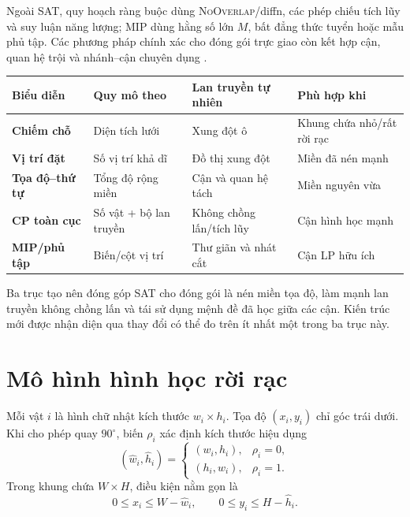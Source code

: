 Ngoài SAT, quy hoạch ràng buộc dùng \textsc{NoOverlap}/diffn, các phép chiếu
tích lũy và suy luận năng lượng; MIP dùng hằng số lớn \(M\), bất đẳng thức
tuyển hoặc mẫu phủ tập. Các phương pháp chính xác cho đóng gói trực giao còn
kết hợp cận, quan hệ trội và nhánh--cận chuyên dụng
\parencite{clautiaux2007orthogonal,clautiaux2008cp}.

\begin{center}
\label{tab:packing-formulations}
\begin{tabularx}{\textwidth}{@{}>{\bfseries\sffamily}p{}YYY@{}}
\toprule
Biểu diễn & Quy mô theo & Lan truyền tự nhiên & Phù hợp khi\\
\midrule
Chiếm chỗ & Diện tích lưới & Xung đột ô & Khung chứa nhỏ/rất rời rạc\\
Vị trí đặt & Số vị trí khả dĩ & Đồ thị xung đột & Miền đã nén mạnh\\
Tọa độ--thứ tự & Tổng độ rộng miền & Cận và quan hệ tách & Miền nguyên vừa\\
CP toàn cục & Số vật + bộ lan truyền & Không chồng lấn/tích lũy & Cận hình học mạnh\\
MIP/phủ tập & Biến/cột vị trí & Thư giãn và nhát cắt & Cận LP hữu ích\\
\bottomrule
\end{tabularx}
\end{center}

Ba trục tạo nên đóng góp SAT cho đóng gói là nén miền tọa độ, làm mạnh lan
truyền không chồng lấn và tái sử dụng mệnh đề đã học giữa các cận. Kiến trúc
mới được nhận diện qua thay đổi có thể đo trên ít nhất một trong ba trục này.

\section{Mô hình hình học rời rạc}

Mỗi vật \(i\) là hình chữ nhật kích thước \(w_i\times h_i\). Tọa độ
\((x_i,y_i)\) chỉ góc trái dưới. Khi cho phép quay \(90^\circ\), biến
\(\rho_i\) xác định kích thước hiệu dụng
\[
  (\widehat w_i,\widehat h_i)=
  \begin{cases}
    (w_i,h_i), & \rho_i=0,\\
    (h_i,w_i), & \rho_i=1.
  \end{cases}
\]
Trong khung chứa \(W\times H\), điều kiện nằm gọn là
\[
  0\le x_i\le W-\widehat w_i,
  \qquad
  0\le y_i\le H-\widehat h_i.
\]

